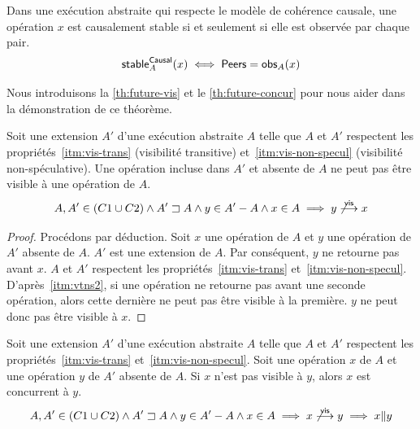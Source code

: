 \begin{theorem}\label{th:cs}
Dans une exécution abstraite qui respecte le modèle de cohérence causale, une opération $x$ est causalement stable si et seulement si elle est observée par chaque pair.
\begin{equation*}
    \operatorname{\mathsf{stable}}_A^{\operatorname{\mathsf{Causal}}}(x) \iff \operatorname{\mathsf{Peers}} = \operatorname{\mathsf{obs}}_A(x)
\end{equation*}
\end{theorem}

Nous introduisons la \autoref{th:future-vis} et le \autoref{th:future-concur} pour nous aider dans la démonstration de ce théorème.

\begin{proposition}\label{th:future-vis}
Soit une extension $A'$ d'une exécution abstraite $A$ telle que $A$ et $A'$ respectent les propriétés~\ref{itm:vis-trans} (visibilité transitive) et~\ref{itm:vis-non-specul} (visibilité non-spéculative).
Une opération incluse dans $A'$ et absente de $A$ ne peut pas être visible à une opération de $A$.
\begin{equation*}
    A, A' \in (C1 \cup C2) \land A' \sqsupset A \land y \in A'- A \land x \in A \implies y \not\overset{\mathsf{vis}}{\longrightarrow} x
\end{equation*}
\end{proposition}

\begin{proof}
Procédons par déduction.
Soit $x$ une opération de $A$ et $y$ une opération de $A'$ absente de $A$.
$A'$ est une extension de $A$.
Par conséquent, $y$ ne retourne pas avant $x$.
$A$ et $A'$ respectent les propriétés~\ref{itm:vis-trans} et~\ref{itm:vis-non-specul}.
D'après~\ref{itm:vtns2}, si une opération ne retourne pas avant une seconde opération, alors cette dernière ne peut pas être visible à la première.
$y$ ne peut donc pas être visible à $x$.
\end{proof}

\begin{corollary}\label{th:future-concur}
Soit une extension $A'$ d'une exécution abstraite $A$ telle que $A$ et $A'$ respectent les propriétés~\ref{itm:vis-trans} et~\ref{itm:vis-non-specul}.
Soit une opération $x$ de $A$ et une opération $y$ de $A'$ absente de $A$.
Si $x$ n'est pas visible à $y$, alors $x$ est concurrent à $y$.
\begin{equation*}
    A, A' \in (C1 \cup C2) \land A' \sqsupset A \land y \in A'- A \land x \in A \implies x \not\overset{\mathsf{vis}}{\longrightarrow} y \implies x \| y
\end{equation*}
\end{corollary}


